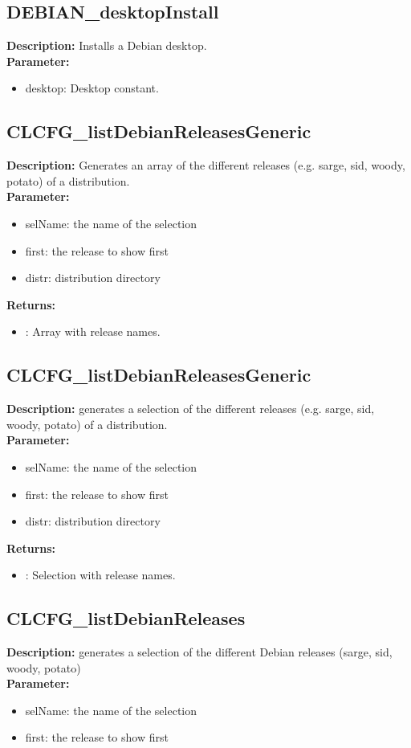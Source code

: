 \subsection{DEBIAN\_desktopInstall}
\textbf{Description:} Installs a Debian desktop.\\
\textbf{Parameter:}
\begin{itemize}
\item desktop: Desktop constant.
\end{itemize}

\subsection{CLCFG\_listDebianReleasesGeneric}
\textbf{Description:} Generates an array of the different releases (e.g. sarge, sid, woody, potato) of a distribution.\\
\textbf{Parameter:}
\begin{itemize}
\item selName: the name of the selection
\item first: the release to show first
\item distr: distribution directory
\end{itemize}
\textbf{Returns:}
\begin{itemize}
\item : Array with release names.
\end{itemize}

\subsection{CLCFG\_listDebianReleasesGeneric}
\textbf{Description:} generates a selection of the different releases (e.g. sarge, sid, woody, potato) of a distribution.\\
\textbf{Parameter:}
\begin{itemize}
\item selName: the name of the selection
\item first: the release to show first
\item distr: distribution directory
\end{itemize}
\textbf{Returns:}
\begin{itemize}
\item : Selection with release names.
\end{itemize}

\subsection{CLCFG\_listDebianReleases}
\textbf{Description:} generates a selection of the different Debian releases (sarge, sid, woody, potato)\\
\textbf{Parameter:}
\begin{itemize}
\item selName: the name of the selection
\item first: the release to show first
\end{itemize}

